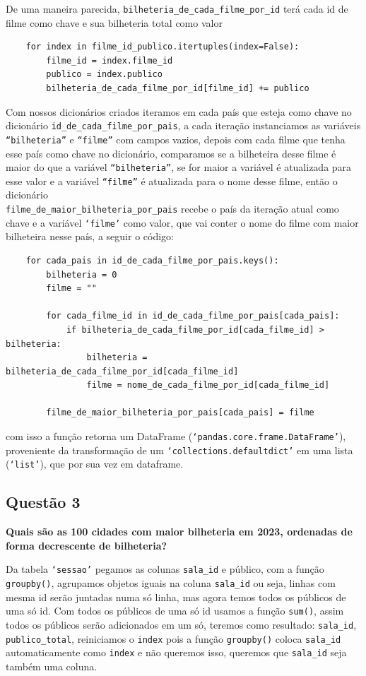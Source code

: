 \documentclass[12pt, a4paper]{article}
\begin{document}
De uma maneira parecida, \verb|bilheteria_de_cada_filme_por_id| terá cada id de filme como chave e sua bilheteria total como valor

\begin{verbatim}
    for index in filme_id_publico.itertuples(index=False):
        filme_id = index.filme_id
        publico = index.publico
        bilheteria_de_cada_filme_por_id[filme_id] += publico
\end{verbatim}

Com nossos dicionários criados iteramos em cada país que esteja como chave no dicionário \verb|id_de_cada_filme_por_pais|, a cada iteração instanciamos as variáveis \texttt{``bilheteria''} e \texttt{``filme''} com campos vazios, depois com cada filme que tenha esse país como chave no dicionário, comparamos se a bilheteira desse filme é maior do que a variável \texttt{``bilheteria''}, se for maior a variável é atualizada para esse valor e a variável \texttt{``filme''} é atualizada para o nome desse filme, então o dicionário\\ \verb|filme_de_maior_bilheteria_por_pais| recebe o país da iteração atual como chave e a variável \texttt{`filme'} como valor, que vai conter o nome do filme com maior bilheteira nesse país, a seguir o código:

\begin{verbatim}
    for cada_pais in id_de_cada_filme_por_pais.keys():
        bilheteria = 0
        filme = ""
        
        for cada_filme_id in id_de_cada_filme_por_pais[cada_pais]:
            if bilheteria_de_cada_filme_por_id[cada_filme_id] > bilheteria:
                bilheteria = bilheteria_de_cada_filme_por_id[cada_filme_id]
                filme = nome_de_cada_filme_por_id[cada_filme_id]

        filme_de_maior_bilheteria_por_pais[cada_pais] = filme
\end{verbatim}
com isso a função retorna um DataFrame (\texttt{`pandas.core.frame.DataFrame'}), proveniente da transformação de um \texttt{`collections.defaultdict'} em uma lista (\texttt{`list'}), que por sua vez em dataframe.

\subsection{Questão 3}
\textbf{Quais são as 100 cidades com maior bilheteria em 2023, ordenadas de forma decrescente de bilheteria?}

Da tabela \texttt{`sessao'} pegamos as colunas \verb|sala_id| e público, com a função \texttt{groupby()}, agrupamos objetos iguais na coluna \verb|sala_id| ou seja, linhas com mesma id serão juntadas numa só linha, mas agora temos todos os públicos de uma só id. Com todos os públicos de uma só id usamos a função \texttt{sum()}, assim todos os públicos serão adicionados em um só, teremos como resultado: \verb|sala_id|, \verb|publico_total|, reiniciamos o \texttt{index} pois a função \texttt{groupby()} coloca \verb|sala_id| automaticamente como \texttt{index} e não queremos isso, queremos que \verb|sala_id| seja também uma coluna.
\end{document}
